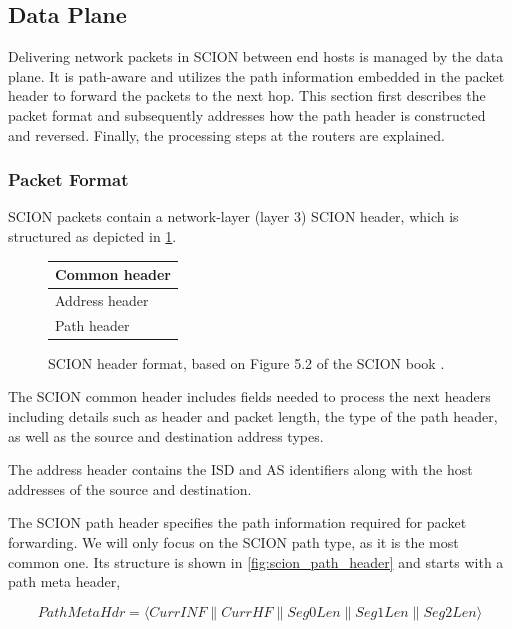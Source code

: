 \subsection{Data Plane}
Delivering network packets in SCION between end hosts is managed by the data plane.
It is path-aware and utilizes the path information embedded in the packet header to forward the packets to the next hop.
This section first describes the packet format and subsequently addresses how the path header is constructed and reversed.
Finally, the processing steps at the routers are explained.

\subsubsection{Packet Format}
SCION packets contain a network-layer (layer 3) SCION header, which is structured as depicted in \cref{fig:scion_header_format}.

\begin{figure}[h]
    \centering
    \renewcommand{\arraystretch}{1.5} %
    \begin{tabularx}{0.5\textwidth}{|>{\centering\arraybackslash}X|}
        \hline
        Common header \\
        \hline
        Address header \\
        \hline
        Path header \\
        \hline
    \end{tabularx}
    \caption{SCION header format, based on Figure 5.2 of the SCION book \cite{Perrig2022}.}
    \label{fig:scion_header_format}
\end{figure}

The SCION common header includes fields needed to process the next headers including details such as header and packet length, the type of the path header, as well as the source and destination address types.

The address header contains the ISD and AS identifiers along with the host addresses of the source and destination.

The SCION path header specifies the path information required for packet forwarding.
We will only focus on the SCION path type, as it is the most common one.
Its structure is shown in \cref{fig:scion_path_header} and starts with a path meta header, 

$$ PathMetaHdr = \langle CurrINF \parallel CurrHF \parallel Seg0Len \parallel Seg1Len \parallel Seg2Len \rangle $$

